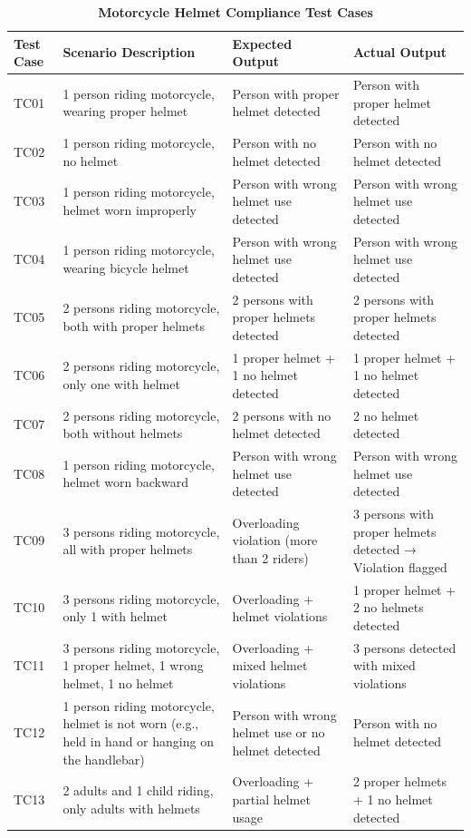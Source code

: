 \begin{refsection}
\begin{table}[H]
    \centering
    \caption{\textbf{Motorcycle Helmet Compliance Test Cases}}
    \label{tbl:helmetCompliance}
    \renewcommand{\arraystretch}{1} %
    \fontsize{11}{12}\selectfont %
    \begin{tabular}{p{1.5cm} p{5cm} p{4.5cm} p{4.5cm}}
    \hline
        \textbf{Test Case} & \textbf{Scenario Description} & \textbf{Expected Output} & \textbf{Actual Output} \\ \hline
        TC01 & 1 person riding motorcycle, wearing proper helmet & Person with proper helmet detected & Person with proper helmet detected \\
        TC02 & 1 person riding motorcycle, no helmet & Person with no helmet detected & Person with no helmet detected \\
        TC03 & 1 person riding motorcycle, helmet worn improperly & Person with wrong helmet use detected & Person with wrong helmet use detected \\
        TC04 & 1 person riding motorcycle, wearing bicycle helmet & Person with wrong helmet use detected & Person with wrong helmet use detected \\
        TC05 & 2 persons riding motorcycle, both with proper helmets & 2 persons with proper helmets detected & 2 persons with proper helmets detected \\
        TC06 & 2 persons riding motorcycle, only one with helmet & 1 proper helmet + 1 no helmet detected & 1 proper helmet + 1 no helmet detected \\
        TC07 & 2 persons riding motorcycle, both without helmets & 2 persons with no helmet detected & 2 no helmet detected \\
        TC08 & 1 person riding motorcycle, helmet worn backward & Person with wrong helmet use detected & Person with wrong helmet use detected \\
        TC09 & 3 persons riding motorcycle, all with proper helmets & Overloading violation (more than 2 riders) & 3 persons with proper helmets detected → Violation flagged \\
        TC10 & 3 persons riding motorcycle, only 1 with helmet & Overloading + helmet violations & 1 proper helmet + 2 no helmets detected \\
        TC11 & 3 persons riding motorcycle, 1 proper helmet, 1 wrong helmet, 1 no helmet & Overloading + mixed helmet violations & 3 persons detected with mixed violations \\
        TC12 & 1 person riding motorcycle, helmet is not worn (e.g., held in hand or hanging on the handlebar) & Person with wrong helmet use or no helmet detected & Person with no helmet detected \\
        TC13 & 2 adults and 1 child riding, only adults with helmets & Overloading + partial helmet usage & 2 proper helmets + 1 no helmet detected \\ \hline
    \end{tabular}
\end{table}


\end{refsection}
